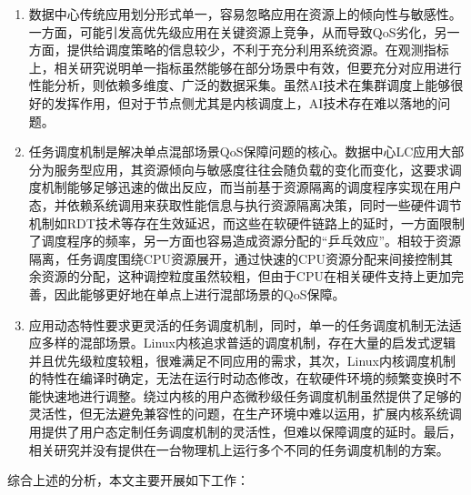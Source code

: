 \begin{enumerate}
    \item 数据中心传统应用划分形式单一，容易忽略应用在资源上的倾向性与敏感性。一方面，可能引发高优先级应用在关键资源上竞争，从而导致QoS劣化，另一方面，提供给调度策略的信息较少，不利于充分利用系统资源。在观测指标上，相关研究说明单一指标虽然能够在部分场景中有效，但要充分对应用进行性能分析，则依赖多维度、广泛的数据采集。虽然AI技术在集群调度上能够很好的发挥作用，但对于节点侧尤其是内核调度上，AI技术存在难以落地的问题。
    \item 任务调度机制是解决单点混部场景QoS保障问题的核心。数据中心LC应用大部分为服务型应用，其资源倾向与敏感度往往会随负载的变化而变化，这要求调度机制能够足够迅速的做出反应，而当前基于资源隔离的调度程序实现在用户态，并依赖系统调用来获取性能信息与执行资源隔离决策，同时一些硬件调节机制如RDT技术等存在生效延迟，而这些在软硬件链路上的延时，一方面限制了调度程序的频率，另一方面也容易造成资源分配的“乒乓效应”。相较于资源隔离，任务调度围绕CPU资源展开，通过快速的CPU资源分配来间接控制其余资源的分配，这种调控粒度虽然较粗，但由于CPU在相关硬件支持上更加完善，因此能够更好地在单点上进行混部场景的QoS保障。
    \item 应用动态特性要求更灵活的任务调度机制，同时，单一的任务调度机制无法适应多样的混部场景。Linux内核追求普适的调度机制，存在大量的启发式逻辑并且优先级粒度较粗，很难满足不同应用的需求，其次，Linux内核调度机制的特性在编译时确定，无法在运行时动态修改，在软硬件环境的频繁变换时不能快速地进行调整。绕过内核的用户态微秒级任务调度机制虽然提供了足够的灵活性，但无法避免兼容性的问题，在生产环境中难以运用，扩展内核系统调用提供了用户态定制任务调度机制的灵活性，但难以保障调度的延时。最后，相关研究并没有提供在一台物理机上运行多个不同的任务调度机制的方案。
\end{enumerate}

综合上述的分析，本文主要开展如下工作：

